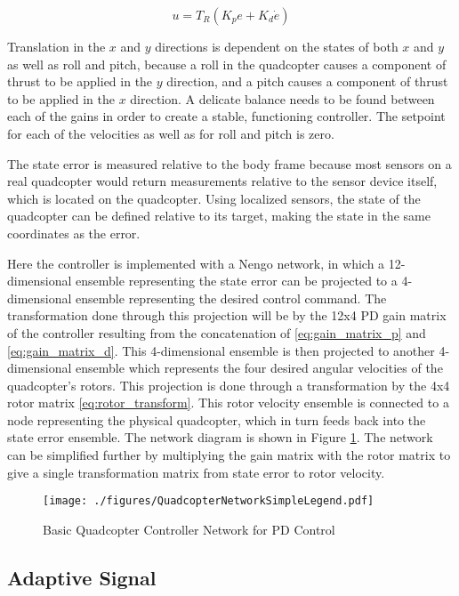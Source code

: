 \documentclass[letterpaper, 10 pt, conference]{ieeeconf}  %
\begin{document}
\begin{equation} \label{eq:control_equation}
u = T_{R}(K_{p}e + K_{d}\dot{e})
\end{equation}

Translation in the $x$ and $y$ directions is dependent on the states of both $x$ and $y$ as well as roll and pitch, because a roll in the quadcopter causes a component of thrust to be applied in the $y$ direction, and a pitch causes a component of thrust to be applied in the $x$ direction.
A delicate balance needs to be found between each of the gains in order to create a stable, functioning controller. 
The setpoint for each of the velocities as well as for roll and pitch is zero.

The state error is measured relative to the body frame because most sensors on a real quadcopter would return measurements relative to the sensor device itself, which is located on the quadcopter. Using localized sensors, the state of the quadcopter can be defined relative to its target, making the state in the same coordinates as the error.

Here the controller is implemented with a Nengo network, in which a 12-dimensional ensemble representing the state error can be projected to a 4-dimensional ensemble representing the desired control command. 
The transformation done through this projection will be by the 12x4 PD gain matrix of the controller resulting from the concatenation of \eqref{eq:gain_matrix_p} and \eqref{eq:gain_matrix_d}. 
This 4-dimensional ensemble is then projected to another 4-dimensional ensemble which represents the four desired angular velocities of the quadcopter's rotors. 
This projection is done through a transformation by the 4x4 rotor matrix \eqref{eq:rotor_transform}. 
This rotor velocity ensemble is connected to a node representing the physical quadcopter, which in turn feeds back into the state error ensemble. 
The network diagram is shown in Figure \ref{fig:NetBasic}. 
The network can be simplified further by multiplying the gain matrix with the rotor matrix to give a single transformation matrix from state error to rotor velocity. 

\begin{figure}
\centering
\texttt{[image: ./figures/QuadcopterNetworkSimpleLegend.pdf]}
\caption{Basic Quadcopter Controller Network for PD Control}
\label{fig:NetBasic}
\end{figure}

\subsection{Adaptive Signal}
\end{document}
